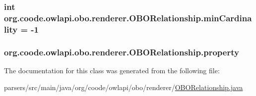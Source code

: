 \hypertarget{classorg_1_1coode_1_1owlapi_1_1obo_1_1renderer_1_1_o_b_o_relationship_aa87a2573ca61f232b710db8a2a358f32}{
\subsubsection[{min\-Cardinality}]{\setlength{\rightskip}{0pt plus 5cm}int org.\-coode.\-owlapi.\-obo.\-renderer.\-O\-B\-O\-Relationship.\-min\-Cardinality = -\/1\hspace{0.3cm}{\ttfamily [private]}}}\label{classorg_1_1coode_1_1owlapi_1_1obo_1_1renderer_1_1_o_b_o_relationship_aa87a2573ca61f232b710db8a2a358f32}
\hypertarget{classorg_1_1coode_1_1owlapi_1_1obo_1_1renderer_1_1_o_b_o_relationship_aa7d4cc9608d41ce5b7e0067003e111cf}{
\subsubsection[{property}]{ org.\-coode.\-owlapi.\-obo.\-renderer.\-O\-B\-O\-Relationship.\-property\hspace{0.3cm}{\ttfamily [private]}}}\label{classorg_1_1coode_1_1owlapi_1_1obo_1_1renderer_1_1_o_b_o_relationship_aa7d4cc9608d41ce5b7e0067003e111cf}


The documentation for this class was generated from the following file\-:\begin{DoxyCompactItemize}
\item 
parsers/src/main/java/org/coode/owlapi/obo/renderer/\hyperlink{_o_b_o_relationship_8java}{O\-B\-O\-Relationship.\-java}\end{DoxyCompactItemize}
